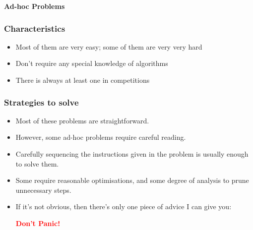 \documentclass[svgnames,dvipsnames,usenames]{beamer}
\begin{document}
\begin{frame}   
    \vspace*{\fill}
    \begingroup
    \centering
    \begin{center}
        \huge \textbf{Ad-hoc Problems}
    \end{center}
\endgroup
\vspace*{\fill}
\end{frame}

\begin{frame}
    \frametitle{Characteristics}
    \begin{itemize}
            \pause
        \item Most of them are very easy; some of them are very very hard
            \pause
        \item Don't require any special knowledge of algorithms
            \pause
        \item There is always at least one in competitions
    \end{itemize}
\end{frame}

\begin{frame}
    \frametitle{Strategies to solve}
    \begin{itemize}
            \pause
        \item Most of these problems are straightforward.
            \pause
        \item However, some ad-hoc problems require careful reading. 
            \pause
        \item Carefully sequencing the instructions given in the problem is usually enough to solve them.
            \pause
        \item Some require reasonable optimisations, and some degree of analysis to prune unnecessary steps.
            \pause
        \item If it's not obvious, then there's only one piece of advice I can give you:

            \vspace*{\fill}
            \begingroup
            \centering
            \pause
            \begin{center}
                \large \textbf{\textcolor{red}{Don't Panic!}}
            \end{center}
        \endgroup
        \vspace*{\fill}
\end{itemize}
\end{frame}
\end{document}
